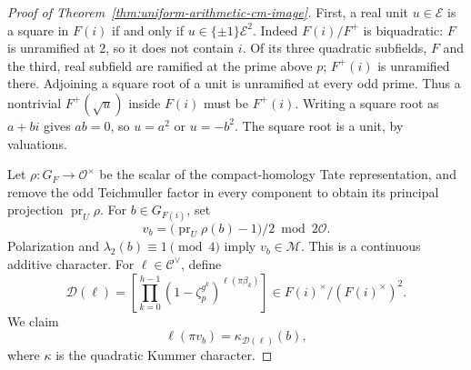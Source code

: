 \begin{proof}[Proof of Theorem~\ref{thm:uniform-arithmetic-cm-image}]
First, a real unit \(u\in\mathscr E\) is a square in \(F(i)\)
if and only if \(u\in\{\pm1\}\mathscr E^2\).
Indeed \(F(i)/F^+\) is biquadratic: \(F\) is unramified at \(2\),
so it does not contain \(i\). Of its three quadratic subfields,
\(F\) and the third, real subfield are ramified at the prime
above \(p\); \(F^+(i)\) is unramified there. Adjoining a square
root of a unit is unramified at every odd prime. Thus a nontrivial
\(F^+(\sqrt u)\) inside \(F(i)\) must be \(F^+(i)\).
Writing a square root as \(a+bi\) gives \(ab=0\), so \(u=a^2\)
or \(u=-b^2\). The square root is a unit, by valuations.

Let \(\rho:G_F\to\mathcal O^\times\) be the scalar of the compact-homology
Tate representation, and remove the odd Teichmuller factor in
every component to obtain its principal projection
\(\operatorname{pr}_U\rho\). For \(b\in G_{F(i)}\), set
\[
 v_b=\bigl(\operatorname{pr}_U\rho(b)-1\bigr)/2\bmod2\mathcal O.
\]
Polarization and \(\lambda_2(b)\equiv1\pmod4\) imply
\(v_b\in\mathscr M\). This is a continuous additive character.
For \(\ell\in\mathscr C^\vee\), define
\[
 \mathscr D(\ell)=
 \left[\prod_{k=0}^{h-1}
   (1-\zeta_p^{g^k})^{\ell(\pi\beta_k)}\right]
          \in F(i)^\times/(F(i)^\times)^2.
\]
We claim
\begin{equation}
 \ell(\pi v_b)=\kappa_{\mathscr D(\ell)}(b),
 \label{eq:uniform-jacobi-kummer}
\end{equation}
where \(\kappa\) is the quadratic Kummer character.


\end{proof}
